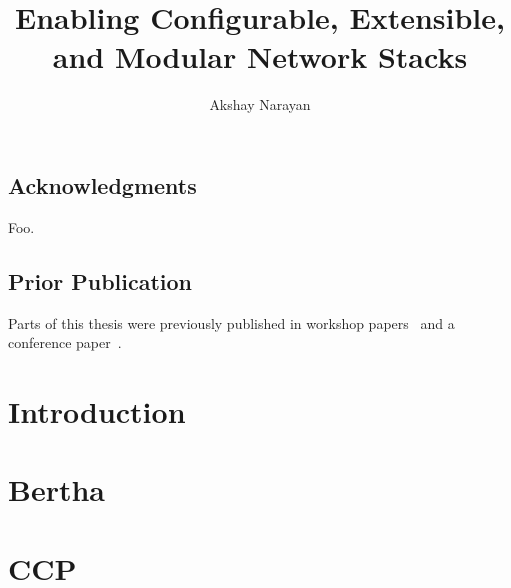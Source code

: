 \documentclass[fontsize=12pt,paper=letter,twosided,cleardoublepage=plain,final]{scrbook}
\title{Enabling Configurable, Extensible, and Modular Network Stacks}
\author{Akshay Narayan}
\begin{document}
\frontmatter



\cleardoublepage


\cleardoublepage

\section*{Acknowledgments}
\begin{spacing}{1}
%
    Foo.
\end{spacing}
\cleardoublepage

\section*{Prior Publication}
Parts of this thesis were previously published in workshop papers~\cite{ccp, bertha} and a conference
paper~\cite{ccp}.
\cleardoublepage

\tableofcontents

\mainmatter

\chapter{Introduction}\label{s:intro}



\chapter{Bertha}\label{s:bertha}


\afterpage{\FloatBarrier}
\afterpage{\clearpage}

\afterpage{\FloatBarrier}
\afterpage{\clearpage}

\afterpage{\FloatBarrier}
\afterpage{\clearpage}

\afterpage{\FloatBarrier}
\afterpage{\clearpage}

\afterpage{\FloatBarrier}
\afterpage{\clearpage}

\afterpage{\FloatBarrier}
\afterpage{\clearpage}

\chapter{CCP}\label{s:ccp}


\afterpage{\FloatBarrier}
\afterpage{\clearpage}

\afterpage{\FloatBarrier}
\afterpage{\clearpage}

\afterpage{\FloatBarrier}
\afterpage{\clearpage}

\afterpage{\FloatBarrier}
\afterpage{\clearpage}

\afterpage{\FloatBarrier}
\afterpage{\clearpage}

\afterpage{\FloatBarrier}
\afterpage{\clearpage}

\afterpage{\FloatBarrier}
\afterpage{\clearpage}

\end{document}
